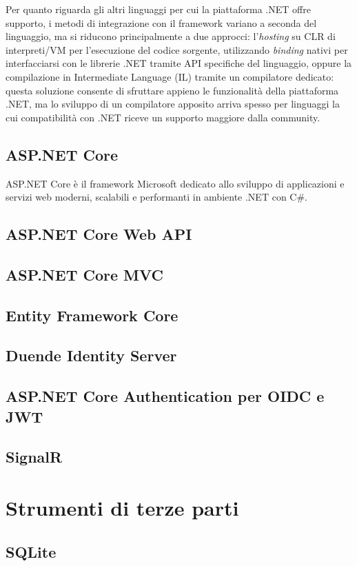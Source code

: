 Per quanto riguarda gli altri linguaggi per cui la piattaforma .NET offre supporto, i metodi di integrazione con il framework variano a seconda del linguaggio, ma si riducono principalmente a due approcci: l'\emph{hosting} su CLR di interpreti/VM per l'esecuzione del codice sorgente, utilizzando \emph{binding} nativi per interfacciarsi con le librerie .NET tramite API specifiche del linguaggio, oppure la compilazione in Intermediate Language (IL) tramite un compilatore dedicato: questa soluzione consente di sfruttare appieno le funzionalità della piattaforma .NET, ma lo sviluppo di un compilatore apposito arriva spesso per linguaggi la cui compatibilità con .NET riceve un supporto maggiore dalla community.

\subsection{ASP.NET Core}
ASP.NET Core è il framework Microsoft dedicato allo sviluppo di applicazioni e servizi web moderni, scalabili e performanti in ambiente .NET con C\#.






\subsection{ASP.NET Core Web API}
\subsection{ASP.NET Core MVC}
\subsection{Entity Framework Core}
\subsection{Duende Identity Server}
\subsection{ASP.NET Core Authentication per OIDC e JWT}
\subsection{SignalR}
\section{Strumenti di terze parti}
\subsection{SQLite}
